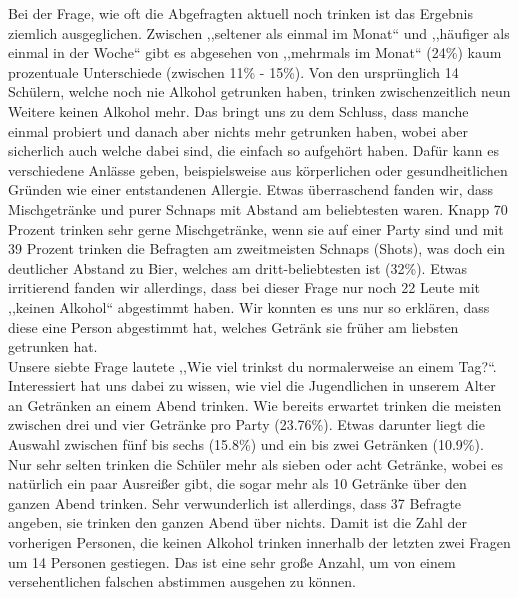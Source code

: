 \documentclass[12pt]{article}
\begin{document}
Bei der Frage, wie oft die Abgefragten aktuell noch trinken ist das Ergebnis ziemlich ausgeglichen. Zwischen ,,seltener als einmal im Monat“ und ,,häufiger als einmal in der Woche“ gibt es abgesehen von ,,mehrmals im Monat“ (24\%) kaum prozentuale Unterschiede (zwischen 11\% - 15\%). Von den ursprünglich 14 Schülern, welche noch nie Alkohol getrunken haben, trinken zwischenzeitlich neun Weitere keinen Alkohol mehr. Das bringt uns zu dem Schluss, dass manche einmal probiert und danach aber nichts mehr getrunken haben, wobei aber sicherlich auch welche dabei sind, die einfach so aufgehört haben. Dafür kann es verschiedene Anlässe geben, beispielsweise aus körperlichen oder gesundheitlichen Gründen wie einer entstandenen Allergie. 
Etwas überraschend fanden wir, dass Mischgetränke und purer Schnaps mit Abstand am beliebtesten waren. Knapp 70 Prozent trinken sehr gerne Mischgetränke, wenn sie auf einer Party sind und mit 39 Prozent trinken die Befragten am zweitmeisten Schnaps (Shots), was doch ein deutlicher Abstand zu Bier, welches am dritt-­beliebtesten ist (32\%). Etwas irritierend fanden wir allerdings, dass bei dieser Frage nur noch 22 Leute mit ,,keinen Alkohol“ abgestimmt haben. Wir konnten es uns nur so erklären, dass diese eine Person abgestimmt hat, welches Getränk sie früher am liebsten getrunken hat. \\
Unsere siebte Frage lautete ,,Wie viel trinkst du normalerweise an einem Tag?“. Interessiert hat uns dabei zu wissen, wie viel die Jugendlichen in unserem Alter an Getränken an einem Abend trinken. Wie bereits erwartet trinken die meisten zwischen drei und vier Getränke pro Party (23.76\%). Etwas darunter liegt die Auswahl zwischen fünf bis sechs (15.8\%) und ein bis zwei Getränken (10.9\%). Nur sehr selten trinken die Schüler mehr als sieben oder acht Getränke, wobei es natürlich ein paar Ausreißer gibt, die sogar mehr als 10 Getränke über den ganzen Abend trinken. Sehr verwunderlich ist allerdings, dass 37 Befragte angeben, sie trinken den ganzen Abend über nichts. Damit ist die Zahl der vorherigen Personen, die keinen Alkohol trinken innerhalb der letzten zwei Fragen um 14 Personen gestiegen. Das ist eine sehr große Anzahl, um von einem versehentlichen falschen abstimmen ausgehen zu können. \\
\end{document}

